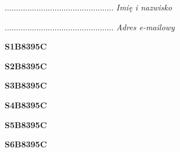 \begin{turn}{90}\begin{minipage}{\linewidth} \vspace{20mm} ................................................  \textit{Imię i nazwisko}\end{minipage}\end{turn}

\begin{turn}{90}\begin{minipage}{\linewidth} \vspace{20mm} ................................................  \textit{Adres e-mailowy}\end{minipage}\end{turn}

\begin{turn}{90}\huge \begin{minipage}{\linewidth} \vspace{10mm}\textbf{S1B8395C}\end{minipage}\end{turn}

\begin{turn}{90}\huge \begin{minipage}{\linewidth} \vspace{10mm}\textbf{S2B8395C}\end{minipage}\end{turn}

\begin{turn}{90}\huge \begin{minipage}{\linewidth} \vspace{10mm}\textbf{S3B8395C}\end{minipage}\end{turn}

\begin{turn}{90}\huge \begin{minipage}{\linewidth} \vspace{10mm}\textbf{S4B8395C}\end{minipage}\end{turn}

\begin{turn}{90}\huge \begin{minipage}{\linewidth} \vspace{10mm}\textbf{S5B8395C}\end{minipage}\end{turn}

\begin{turn}{90}\huge \begin{minipage}{\linewidth} \vspace{10mm}\textbf{S6B8395C}\end{minipage}\end{turn}

